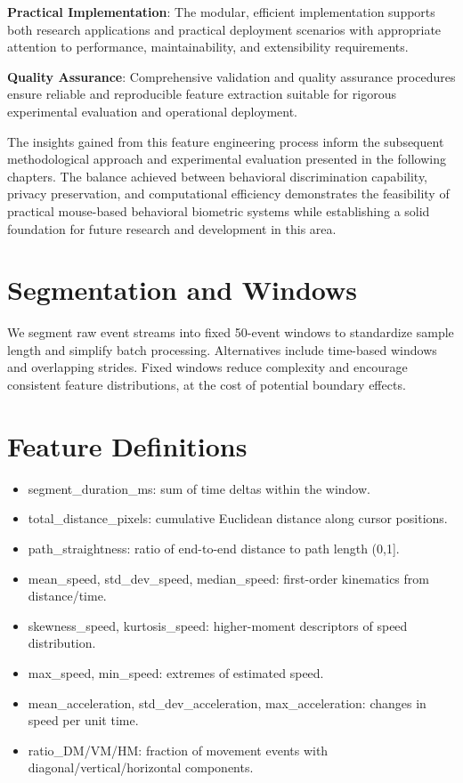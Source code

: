 \documentclass[
  12pt,
  a4paper,
]{report}
\providecommand{\tightlist}{%
  \setlength{\itemsep}{0pt}\setlength{\parskip}{0pt}}
\begin{document}
\textbf{Practical Implementation}: The modular, efficient implementation
supports both research applications and practical deployment scenarios
with appropriate attention to performance, maintainability, and
extensibility requirements.

\textbf{Quality Assurance}: Comprehensive validation and quality
assurance procedures ensure reliable and reproducible feature extraction
suitable for rigorous experimental evaluation and operational
deployment.

The insights gained from this feature engineering process inform the
subsequent methodological approach and experimental evaluation presented
in the following chapters. The balance achieved between behavioral
discrimination capability, privacy preservation, and computational
efficiency demonstrates the feasibility of practical mouse-based
behavioral biometric systems while establishing a solid foundation for
future research and development in this area.

\newpage

\section{Segmentation and Windows}\label{segmentation-and-windows}

We segment raw event streams into fixed 50-event windows to standardize
sample length and simplify batch processing. Alternatives include
time-based windows and overlapping strides. Fixed windows reduce
complexity and encourage consistent feature distributions, at the cost
of potential boundary effects.

\section{Feature Definitions}\label{feature-definitions}

\begin{itemize}
\tightlist
\item
  segment\_duration\_ms: sum of time deltas within the window.
\item
  total\_distance\_pixels: cumulative Euclidean distance along cursor
  positions.
\item
  path\_straightness: ratio of end-to-end distance to path length
  (0,1{]}.
\item
  mean\_speed, std\_dev\_speed, median\_speed: first-order kinematics
  from distance/time.
\item
  skewness\_speed, kurtosis\_speed: higher-moment descriptors of speed
  distribution.
\item
  max\_speed, min\_speed: extremes of estimated speed.
\item
  mean\_acceleration, std\_dev\_acceleration, max\_acceleration: changes
  in speed per unit time.
\item
  ratio\_DM/VM/HM: fraction of movement events with
  diagonal/vertical/horizontal components.
\end{itemize}
\end{document}
